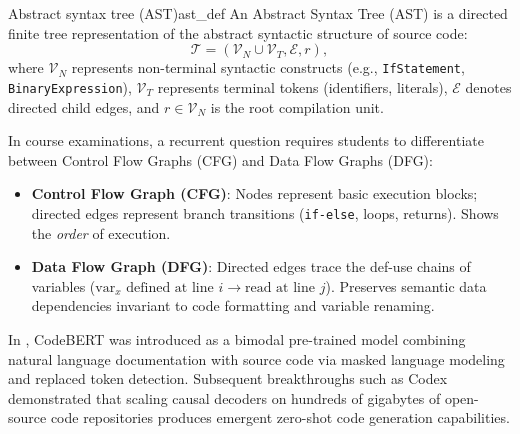 \documentclass[../../main.tex]{subfiles}
\begin{document}
\begin{definition}{Abstract syntax tree (AST)}{ast_def}
An Abstract Syntax Tree (AST) is a directed finite tree representation of the abstract syntactic structure of source code:
\begin{equation}
\mathcal{T} = (\mathcal{V}_N \cup \mathcal{V}_T, \mathcal{E}, r),
\end{equation}
where $\mathcal{V}_N$ represents non-terminal syntactic constructs (e.g., \texttt{IfStatement}, \texttt{BinaryExpression}), $\mathcal{V}_T$ represents terminal tokens (identifiers, literals), $\mathcal{E}$ denotes directed child edges, and $r \in \mathcal{V}_N$ is the root compilation unit.
\end{definition}

\begin{examinsight}
In course examinations, a recurrent question requires students to differentiate between Control Flow Graphs (CFG) and Data Flow Graphs (DFG):
\begin{itemize}
    \item \textbf{Control Flow Graph (CFG)}: Nodes represent basic execution blocks; directed edges represent branch transitions (\texttt{if-else}, loops, returns). Shows the \emph{order} of execution.
    \item \textbf{Data Flow Graph (DFG)}: Directed edges trace the def-use chains of variables ($\text{var}_x \text{ defined at line } i \to \text{read at line } j$). Preserves semantic data dependencies invariant to code formatting and variable renaming.
\end{itemize}
\end{examinsight}

\begin{deepdive}
In \citep{feng2020codebert}, CodeBERT was introduced as a bimodal pre-trained model combining natural language documentation with source code via masked language modeling and replaced token detection. Subsequent breakthroughs such as Codex \citep{chen2021codex} demonstrated that scaling causal decoders on hundreds of gigabytes of open-source code repositories produces emergent zero-shot code generation capabilities.
\end{deepdive}
\end{document}
